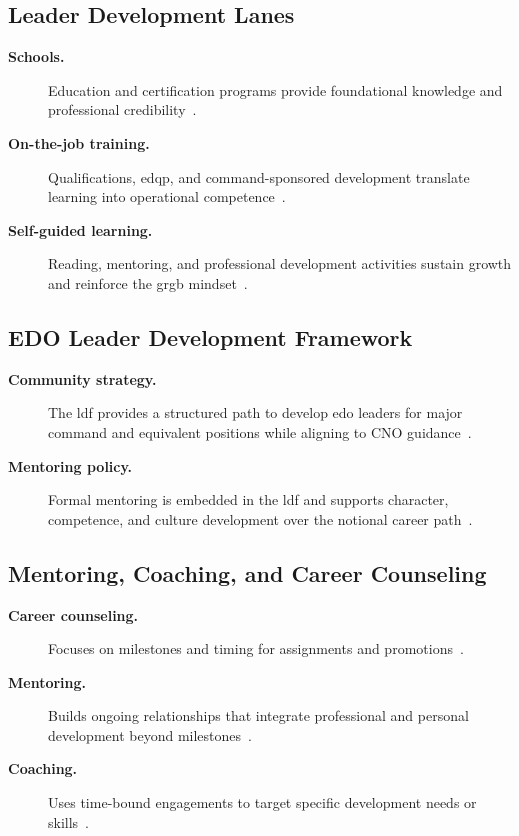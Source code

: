 \documentclass[../main.tex]{subfiles}
\begin{document}
\subsection{Leader Development Lanes}
\begin{description}
  \item[\textbf{Schools.}] Education and certification programs provide foundational knowledge and
  professional credibility~\autocite{edo-5-2-10-leader-development-framework-2025}.
  \item[\textbf{On-the-job training.}] Qualifications, \ac{edqp}, and command-sponsored development translate
  learning into operational competence~\autocite{edo-5-2-10-leader-development-framework-2025}.
  \item[\textbf{Self-guided learning.}] Reading, mentoring, and professional development activities sustain
  growth and reinforce the \ac{grgb} mindset~\autocite{edo-5-2-10-leader-development-framework-2025,Navy-NLDF-GRGB-Leaders-Toolkit-2026}.
\end{description}

\subsection{EDO Leader Development Framework}
\begin{description}
  \item[\textbf{Community strategy.}] The \ac{ldf} provides a structured path to develop \ac{edo} leaders for
  major command and equivalent positions while aligning to CNO guidance~\autocite{edo-5-2-10-leader-development-framework-2025}.
  \item[\textbf{Mentoring policy.}] Formal mentoring is embedded in the \ac{ldf} and supports character,
  competence, and culture development over the notional career path~\autocite{edo-5-2-10-leader-development-framework-2025}.
\end{description}

\subsection{Mentoring, Coaching, and Career Counseling}
\begin{description}
  \item[\textbf{Career counseling.}] Focuses on milestones and timing for assignments and promotions~\autocite{edo-5-2-10-leader-development-framework-2025}.
  \item[\textbf{Mentoring.}] Builds ongoing relationships that integrate professional and personal
  development beyond milestones~\autocite{edo-5-2-10-leader-development-framework-2025}.
  \item[\textbf{Coaching.}] Uses time-bound engagements to target specific development needs or skills~\autocite{edo-5-2-10-leader-development-framework-2025}.
\end{description}
\end{document}
